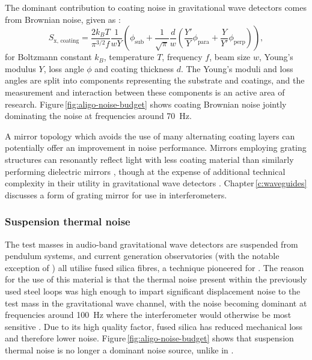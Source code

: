The dominant contribution to coating noise in gravitational wave detectors comes from Brownian noise, given as \cite{Harry2002}:
\begin{equation}
  \label{eq:coating-brownian-psd}
  S_{\text{x, coating}} = \frac{2 k_B T}{\pi^{3/2} f} \frac{1}{w Y} \left( \phi_{\text{sub}} + \frac{1}{\sqrt{\pi}} \frac{d}{w} \left( \frac{Y'}{Y} \phi_{\text{para}} + \frac{Y}{Y'} \phi_{\text{perp}} \right) \right),
\end{equation}
for Boltzmann constant $k_B$, temperature $T$, frequency $f$, beam size $w$, Young's modulus $Y$, loss angle $\phi$ and coating thickness $d$. The Young's moduli and loss angles are split into components representing the substrate and coatings, and the measurement and interaction between these components is an active area of research. Figure\,\ref{fig:aligo-noise-budget} shows coating Brownian noise jointly dominating the noise at frequencies around \SI{70}{\hertz}.

A mirror topology which avoids the use of many alternating coating layers can potentially offer an improvement in noise performance. Mirrors employing grating structures can resonantly reflect light with less coating material than similarly performing dielectric mirrors \cite{Mashev1985}, though at the expense of additional technical complexity in their utility in gravitational wave detectors \cite{Leavey2015}. Chapter\,\ref{c:waveguides} discusses a form of grating mirror for use in interferometers.

\subsubsection{\label{sec:sus-thermal-noise}Suspension thermal noise}
The test masses in audio-band gravitational wave detectors are suspended from pendulum systems, and current generation observatories (with the notable exception of \KAGRA{}) all utilise fused silica fibres, a technique pioneered for \GEO{} \cite{Barr2002}. The reason for the use of this material is that the thermal noise present within the previously used steel loops was high enough to impart significant displacement noise to the test mass in the gravitational wave channel, with the noise becoming dominant at frequencies around \SI{100}{\hertz} where the interferometer would otherwise be most sensitive \cite{Hammond2012}. Due to its high quality factor, fused silica has reduced mechanical loss and therefore lower noise. Figure\,\ref{fig:aligo-noise-budget} shows that suspension thermal noise is no longer a dominant noise source, unlike in \ILIGO{}.

